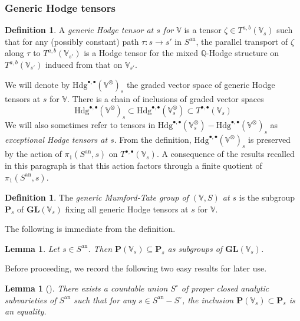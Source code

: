 \documentclass[10pt]{article}
\numberwithin{equation}{subsection}
\theoremstyle{plain}
\newtheorem{lemma}[theorem]{Lemma}
\theoremstyle{definition}
\newtheorem{definition}[theorem]{Definition}
\theoremstyle{remark}
\newcommand{\Q}{\mathbb Q}
\newcommand{\V}{\mathbb V}
\newcommand{\pp}{\mathbf P}
\newcommand{\M}{\mathbf M}
\newcommand{\bul}{\bullet}
\newcommand{\an}{\mathrm{an}}
\newcommand{\hod}{\mathrm{Hdg}}
\newcommand{\gl}{\mathbf{GL}}
\begin{document}
\subsubsection*{Generic Hodge tensors}
\begin{definition}
A \textit{generic Hodge tensor at $s$ for $\V$} is a tensor $\zeta \in T^{a,b}(\V_s)$ such that for any (possibly constant) path $\tau : s \rightarrow s'$ in $S^\an$, the parallel transport of $\zeta$ along $\tau$ to $T^{a,b}(\V_{s'})$ is a Hodge tensor for the mixed $\Q$-Hodge structure on $T^{a,b}(\V_{s'})$ induced from that on $\V_{s'}$.
\end{definition}
We will denote by $\hod^{\bul,\bul}(\V^\otimes)_s$ the graded vector space of generic Hodge tensors at $s$ for $\V$. There is a chain of inclusions of graded vector spaces
\[
\hod^{\bul,\bul}(\V^\otimes)_s \subset \hod^{\bul,\bul}(\V_s^\otimes) \subset T^{\bul,\bul}(\V_s)
\]
We will also sometimes refer to tensors in $\hod^{\bul,\bul}(\V_s^\otimes) -\hod^{\bul,\bul}(\V^\otimes)_s$ as \textit{exceptional Hodge tensors at $s$}. From the definition, $\hod^{\bul,\bul}(\V^\otimes)_s$ is preserved by the action of $\pi_1(S^\an,s)$ on $T^{\bul,\bul}(\V_s)$. A consequence of the results recalled in this paragraph is that this action factors through a finite quotient of $\pi_1(S^\an,s)$.
\begin{definition}
The \textit{generic Mumford-Tate group of $(\V,S)$ at $s$} is the subgroup $\pp_s$ of $\gl(\V_s)$ fixing all generic Hodge tensors at $s$ for $\V$.
\end{definition}
The following is immediate from the definition.
\begin{lemma}
Let $s \in S^\an$. Then $\pp(\V_s) \subseteq \pp_s$ as subgroups of $\gl(\V_s)$.
\end{lemma}
Before proceeding, we record the following two easy results for later use.
\begin{lemma}[{\cite[Lem. 4]{andre}}]\label{exgen}
There exists a countable union $S^\circ$ of proper closed analytic subvarieties of $S^\an$ such that for any $s \in S^\an - S^\circ$, the inclusion $\pp(\V_s) \subset \pp_s$ is an equality. 
\end{lemma}
\end{document}

